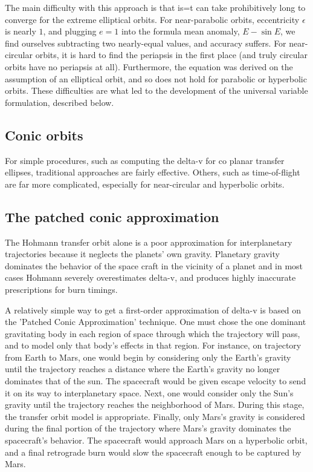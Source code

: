 \documentclass[12pt]{article}
\begin{document}
The main difficulty with this approach is that is=t can take prohibitively long
to converge for the extreme elliptical orbits. For near-parabolic orbits,
eccentricity \(\epsilon\) is nearly \(1\), and plugging \(e=1\) into the
formula mean anomaly, \(E - \sin E\), we find ourselves subtracting two
nearly-equal values, and accuracy suffers. For near-circular orbits, it is hard
to find the periapsis in the first place (and truly circular orbits have no
periapsis at all). Furthermore, the equation was derived on the assumption of
an elliptical orbit, and so does not hold for parabolic or hyperbolic orbits.
These difficulties are what led to the development of the universal variable
formulation, described below.

\subsection{Conic orbits}

For simple procedures, such as computing the delta-v for co planar transfer
ellipses, traditional approaches are fairly effective. Others, such as
time-of-flight are far more complicated, especially for near-circular and
hyperbolic orbits.

\subsection{The patched conic approximation}

The Hohmann transfer orbit alone is a poor approximation for interplanetary
trajectories because it neglects the planets' own gravity. Planetary gravity
dominates the behavior of the space craft in the vicinity of a planet and in
most cases Hohmann severely overestimates delta-v, and produces highly
inaccurate prescriptions for burn timings.

A relatively simple way to get a first-order approximation of delta-v is based
on the 'Patched Conic Approximation' technique. One must chose the one dominant
gravitating body in each region of space through which the trajectory will
pass, and to model only that body's effects in that region. For instance, on
trajectory from Earth to Mars, one would begin by considering only the Earth's
gravity until the trajectory reaches a distance where the Earth's gravity no
longer dominates that of the sun. The spacecraft would be given escape velocity
to send it on its way to interplanetary space. Next, one would consider only
the Sun's gravity until the trajectory reaches the neighborhood of Mars. During
this stage, the transfer orbit model is appropriate. Finally, only Mars's
gravity is considered during the final portion of the trajectory where Mars's
gravity dominates the spacecraft's behavior. The spacecraft would approach Mars
on a hyperbolic orbit, and a final retrograde burn would slow the spacecraft
enough to be captured by Mars.
\end{document}
